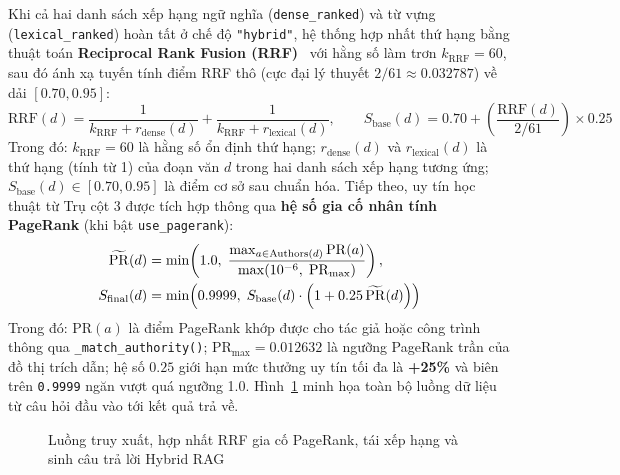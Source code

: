 Khi cả hai danh sách xếp hạng ngữ nghĩa (\texttt{dense\_ranked}) và từ vựng (\texttt{lexical\_ranked}) hoàn tất ở chế độ \texttt{"hybrid"}, hệ thống hợp nhất thứ hạng bằng thuật toán \textbf{Reciprocal Rank Fusion (RRF)}~\cite{cormack2009reciprocal} với hằng số làm trơn $k_{\text{RRF}} = 60$, sau đó ánh xạ tuyến tính điểm RRF thô (cực đại lý thuyết $2/61 \approx 0.032787$) về dải $[0.70, 0.95]$:
\begin{equation}
  \mathrm{RRF}(d) = \frac{1}{k_{\text{RRF}} + r_{\text{dense}}(d)} + \frac{1}{k_{\text{RRF}} + r_{\text{lexical}}(d)},
  \qquad
  S_{\text{base}}(d) = 0.70 + \left(\frac{\mathrm{RRF}(d)}{2 / 61}\right) \times 0.25
  \label{eq:ch4_rrf}
\end{equation}
Trong đó: $k_{\text{RRF}} = 60$ là hằng số ổn định thứ hạng; $r_{\text{dense}}(d)$ và $r_{\text{lexical}}(d)$ là thứ hạng (tính từ 1) của đoạn văn $d$ trong hai danh sách xếp hạng tương ứng; $S_{\text{base}}(d) \in [0.70, 0.95]$ là điểm cơ sở sau chuẩn hóa. Tiếp theo, uy tín học thuật từ Trụ cột 3 được tích hợp thông qua \textbf{hệ số gia cố nhân tính PageRank} (khi bật \texttt{use\_pagerank}):
\begin{align}
  \widetilde{\mathrm{PR}}(d) &= \min\!\left(1.0,\; \frac{\max_{a \in \text{Authors}(d)} \mathrm{PR}(a)}{\max(10^{-6},\; \mathrm{PR}_{\max})}\right), \notag \\
  S_{\text{final}}(d) &= \min\!\left(0.9999,\; S_{\text{base}}(d) \cdot \left(1 + 0.25\,\widetilde{\mathrm{PR}}(d)\right)\right)
  \label{eq:ch4_authority}
\end{align}
Trong đó: $\mathrm{PR}(a)$ là điểm PageRank khớp được cho tác giả hoặc công trình thông qua \texttt{\_match\_authority()}; $\mathrm{PR}_{\max} = 0.012632$ là ngưỡng PageRank trần của đồ thị trích dẫn; hệ số $0.25$ giới hạn mức thưởng uy tín tối đa là \textbf{+25\%} và biên trên \texttt{0.9999} ngăn vượt quá ngưỡng 1.0. Hình~\ref{fig:rag_pipeline_flow} minh họa toàn bộ luồng dữ liệu từ câu hỏi đầu vào tới kết quả trả về.

\begin{figure}[!htbp]
\centering
\DrawRagPipelineDiagram
\caption[Luồng truy xuất và sinh câu trả lời trong kiến trúc Hybrid RAG]{Luồng truy xuất, hợp nhất RRF gia cố PageRank, tái xếp hạng và sinh câu trả lời Hybrid RAG}
\label{fig:rag_pipeline_flow}
\end{figure}
\FloatBarrier

